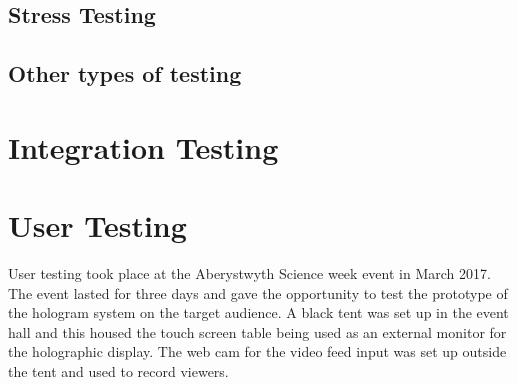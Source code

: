 \subsection{Stress Testing}

\subsection{Other types of testing}

\section{Integration Testing}

\section{User Testing}
User testing took place at the Aberystwyth Science week event in March 2017. The event lasted for three days and gave the opportunity to test the prototype of the hologram system on the target audience. A black tent was set up in the event hall and this housed the touch screen table being used as an external monitor for the holographic display. The web cam for the video feed input was set up outside the tent and used to record viewers.

  
